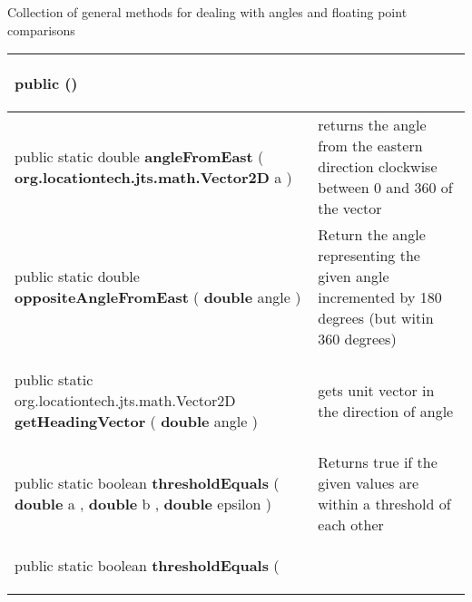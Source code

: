  {\scriptsize Collection of general methods for dealing with angles and floating point comparisons
 
\vspace*{-5pt} 
\begin{tabularx}{\linewidth}{X|m{}}
\label{tab:MathUtilities}
\begin{raggedleft}public  \textbf{\hyperref[tab:MathUtilities]{\color{blue}{MathUtilities}}}()
\end{raggedleft} &
 \\ \hline 
\begin{raggedleft}public static double \textbf{angleFromEast }(\hspace*{ 5pt} \textbf{org.locationtech.jts.math.Vector2D} a  )
\end{raggedleft} &
 returns the angle from the eastern direction clockwise between 0 and 360 of the vector\\ \hline 
\begin{raggedleft}public static double \textbf{oppositeAngleFromEast }(\hspace*{ 5pt} \textbf{double} angle  )
\end{raggedleft} &
 Return the angle representing the given angle incremented by 180 degrees (but witin 360 degrees)\\ \hline 
\begin{raggedleft}public static org.locationtech.jts.math.Vector2D \textbf{getHeadingVector }(\hspace*{ 5pt} \textbf{double} angle  )
\end{raggedleft} &
 gets unit vector in the direction of angle\\ \hline 
\begin{raggedleft}public static boolean \textbf{thresholdEquals }(\newline \hfill 
\hspace*{ 5pt} \textbf{double} a , \newline
 \hspace*{ 5pt} \textbf{double} b , \newline
 \hspace*{ 5pt} \textbf{double} epsilon  )
\end{raggedleft} &
 Returns true if the given values are within a threshold of each other\\ \hline 
\begin{raggedleft}public static boolean \textbf{thresholdEquals }(\newline \hfill 

\end{raggedleft}
\end{tabularx}}
